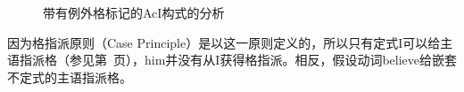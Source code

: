 \begin{figure}
\centering
{}
\caption{\label{Abbildung-ECM}带有例外格标记的AcI构式的分析}
\end{figure}%
因为格指派原则（Case Principle）是以这一原则定义的，所以只有定式I可以给主语指派格（参见第~\pageref{Kasusprinzip-GB}页），him并没有从I获得格指派。相反，假设动词believe给嵌套不定式的主语指派格。

